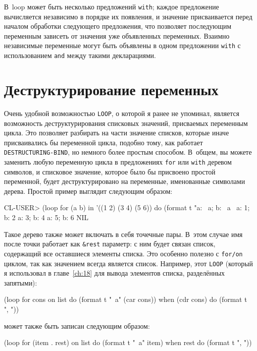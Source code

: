 В~loop может быть несколько предложений \lstinline{with}; каждое предложение вычисляется
независимо в порядке их появления, и значение присваивается перед началом обработки
следующего предложения, что позволяет последующим переменным зависеть от значения уже
объявленных переменных. Взаимно независимые переменные могут быть объявлены в одном
предложении \lstinline{with} с использованием \lstinline{and} между такими дек\-ла\-ра\-ция\-ми.

\section{Деструктурирование переменных}

Очень удобной возможностью \lstinline{LOOP}, о которой я ранее не упоминал, является
возможность деструктурирования списковых значений, присваемых переменным цикла. Это
позволяет разбирать на части значение списков, которые иначе присваивались бы переменной
цикла, подобно тому, как работает \lstinline{DESTRUCTURING-BIND}, но немного более простым
способом. В~общем, вы можете заменить любую переменную цикла в предложениях \lstinline{for} или
\lstinline{with} деревом символов, и списковое значение, которое было бы присвоено простой
переменной, будет деструктурировано на переменные, именованные символами дерева. Простой
пример выглядит следующим образом:

\begin{myverb}
CL-USER> (loop for (a b) in '((1 2) (3 4) (5 6))
            do (format t "a: ~a; b: ~a~%
a: 1; b: 2
a: 3; b: 4
a: 5; b: 6
NIL
\end{myverb}

Такое дерево также может включать в себя точечные пары. В~этом случае имя после точки
работает как \lstinline!&rest! параметр: с ним будет связан список, содержащий все
оставшиеся элементы списка. Это особенно полезно с \lstinline{for/on} циклом, так как значением
всегда является список. Например, этот \lstinline{LOOP} (который я использовал в
главе~\ref{ch:18} для вывода элементов списка, разделённых запятыми):

\begin{myverb}
(loop for cons on list
    do (format t "~a" (car cons))
    when (cdr cons) do (format t ", "))
\end{myverb}

\noindent{}может также быть записан следующим образом:

\begin{myverb}
(loop for (item . rest) on list
    do (format t "~a" item)
    when rest do (format t ", "))
\end{myverb}

